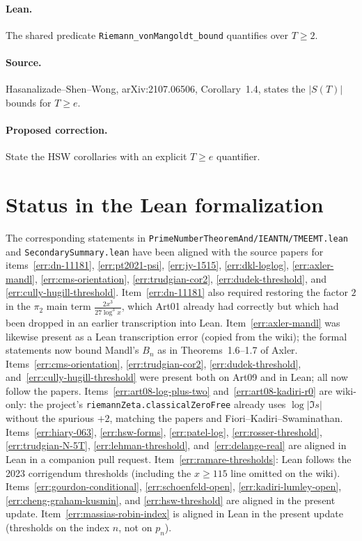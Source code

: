 \documentclass[11pt,a4paper]{article}
\begin{document}
\paragraph{Lean.}
The shared predicate \texttt{Riemann\_vonMangoldt\_bound} quantifies over $T\ge 2$.
\paragraph{Source.}
Hasanalizade--Shen--Wong, arXiv:2107.06506, Corollary~1.4, states the
$|S(T)|$ bounds for $T\ge e$.
\paragraph{Proposed correction.}
State the HSW corollaries with an explicit $T\ge e$ quantifier.

\section*{Status in the Lean formalization}
The corresponding statements in
\texttt{PrimeNumberTheoremAnd/IEANTN/TMEEMT.lean} and
\texttt{SecondarySummary.lean} have been aligned with the source papers
for items~\ref{err:dn-11181}, \ref{err:pt2021-psi}, \ref{err:jy-1515},
\ref{err:dkl-loglog}, \ref{err:axler-mandl}, \ref{err:cms-orientation},
\ref{err:trudgian-cor2}, \ref{err:dudek-threshold}, and
\ref{err:cully-hugill-threshold}.
Item~\ref{err:dn-11181} also required restoring the factor $2$ in the
$\pi_2$ main term $\frac{2x^3}{27\log^3 x}$, which Art01 already had
correctly but which had been dropped in an earlier transcription into Lean.
Item~\ref{err:axler-mandl} was likewise present as a Lean transcription
error (copied from the wiki); the formal statements now bound Mandl's
$B_n$ as in Theorems~1.6--1.7 of Axler.
Items~\ref{err:cms-orientation}, \ref{err:trudgian-cor2},
\ref{err:dudek-threshold}, and~\ref{err:cully-hugill-threshold} were
present both on Art09 and in Lean; all now follow the papers.
Items~\ref{err:art08-log-plus-two} and~\ref{err:art08-kadiri-r0} are
wiki-only: the project's \texttt{riemannZeta.classicalZeroFree} already
uses $\log|\Im s|$ without the spurious $+2$, matching the papers and
Fiori--Kadiri--Swaminathan.
Items~\ref{err:hiary-063}, \ref{err:hsw-forms}, \ref{err:patel-log},
\ref{err:rosser-threshold}, \ref{err:trudgian-N-5T},
\ref{err:lehman-threshold}, and~\ref{err:delange-real} are aligned in
Lean in a companion pull request.
Item~\ref{err:ramare-thresholds}: Lean follows the 2023 corrigendum
thresholds (including the $x\ge 115$ line omitted on the wiki).
Items~\ref{err:gourdon-conditional}, \ref{err:schoenfeld-open},
\ref{err:kadiri-lumley-open}, \ref{err:cheng-graham-kusmin}, and
\ref{err:hsw-threshold} are aligned in the present update.
Item~\ref{err:massias-robin-index} is aligned in Lean in the present
update (thresholds on the index $n$, not on $p_n$).
\end{document}
